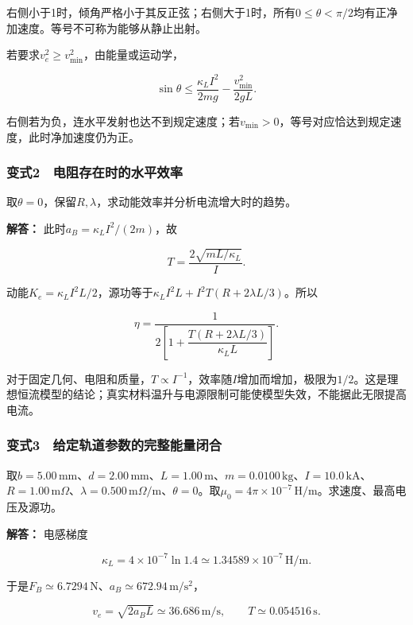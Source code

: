 \documentclass[12pt,a4paper,fontset=fandol]{ctexart}
\begin{document}
右侧小于1时，倾角严格小于其反正弦；右侧大于1时，所有\(0\le\theta<\pi/2\)均有正净加速度。等号不可称为能够从静止出射。

若要求\(v_e^2\ge v_{\min}^2\)，由能量或运动学，

\[
\boxed{
\sin\theta\le
\frac{\kappa_LI^2}{2mg}-\frac{v_{\min}^2}{2gL}}.
\]

右侧若为负，连水平发射也达不到规定速度；若\(v_{\min}>0\)，等号对应恰达到规定速度，此时净加速度仍为正。

\subsubsection{变式2　电阻存在时的水平效率}\label{ux53d8ux5f0f2-ux7535ux963bux5b58ux5728ux65f6ux7684ux6c34ux5e73ux6548ux7387}

取\(\theta=0\)，保留\(R,\lambda\)，求动能效率并分析电流增大时的趋势。

\textbf{解答：} 此时\(a_B=\kappa_LI^2/(2m)\)，故

\[
T=\frac{2\sqrt{mL/\kappa_L}}{I}.
\]

动能\(K_e=\kappa_LI^2L/2\)，源功等于\(\kappa_LI^2L+I^2T(R+2\lambda L/3)\)。所以

\[
\boxed{
\eta=\frac1{2\left[
1+\dfrac{T(R+2\lambda L/3)}{\kappa_LL}\right]}}.
\]

对于固定几何、电阻和质量，\(T\propto I^{-1}\)，效率随\(I\)增加而增加，极限为\(1/2\)。这是理想恒流模型的结论；真实材料温升与电源限制可能使模型失效，不能据此无限提高电流。

\subsubsection{变式3　给定轨道参数的完整能量闭合}\label{ux53d8ux5f0f3-ux7ed9ux5b9aux8f68ux9053ux53c2ux6570ux7684ux5b8cux6574ux80fdux91cfux95edux5408}

取\(b=5.00\,\mathrm{mm}\)、\(d=2.00\,\mathrm{mm}\)、\(L=1.00\,\mathrm m\)、\(m=0.0100\,\mathrm{kg}\)、\(I=10.0\,\mathrm{kA}\)、\(R=1.00\,\mathrm m\Omega\)、\(\lambda=0.500\,\mathrm m\Omega/\mathrm m\)、\(\theta=0\)。取\(\mu_0=4\pi\times10^{-7}\,\mathrm{H/m}\)。求速度、最高电压及源功。

\textbf{解答：} 电感梯度

\[
\kappa_L=4\times10^{-7}\ln1.4
\simeq1.34589\times10^{-7}\,\mathrm{H/m}.
\]

于是\(F_B\simeq6.7294\,\mathrm N\)、\(a_B\simeq672.94\,\mathrm{m/s^2}\)，

\[
v_e=\sqrt{2a_BL}\simeq36.686\,\mathrm{m/s},
\qquad T\simeq0.054516\,\mathrm s.
\]
\end{document}
